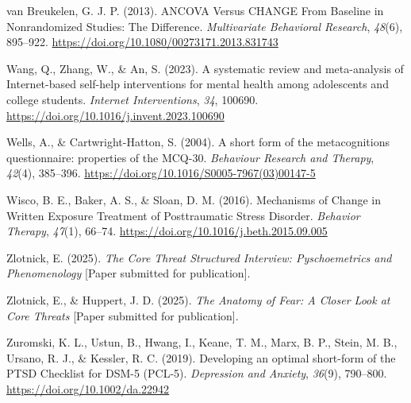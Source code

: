 \documentclass[
  man,floatsintext]{apa7}
\newlength{\cslhangindent}
\newlength{\cslentryspacingunit} %
\newenvironment{CSLReferences}[2] %
 {%
  \setlength{\parindent}{0pt}
  \ifodd #1
  \let\oldpar\par
  \def\par{\hangindent=\cslhangindent\oldpar}
  \fi
  \setlength{\parskip}{#2\cslentryspacingunit}
 }%
 {}
\begin{document}
\begin{CSLReferences}{1}{0}
\leavevmode{}%
van Breukelen, G. J. P. (2013). ANCOVA Versus CHANGE From Baseline in Nonrandomized Studies: The Difference. \emph{Multivariate Behavioral Research}, \emph{48}(6), 895--922. \url{https://doi.org/10.1080/00273171.2013.831743}

\leavevmode{}%
Wang, Q., Zhang, W., \& An, S. (2023). A systematic review and meta-analysis of Internet-based self-help interventions for mental health among adolescents and college students. \emph{Internet Interventions}, \emph{34}, 100690. \url{https://doi.org/10.1016/j.invent.2023.100690}

\leavevmode{}%
Wells, A., \& Cartwright-Hatton, S. (2004). A short form of the metacognitions questionnaire: properties of the MCQ-30. \emph{Behaviour Research and Therapy}, \emph{42}(4), 385--396. \url{https://doi.org/10.1016/S0005-7967(03)00147-5}

\leavevmode{}%
Wisco, B. E., Baker, A. S., \& Sloan, D. M. (2016). Mechanisms of Change in Written Exposure Treatment of Posttraumatic Stress Disorder. \emph{Behavior Therapy}, \emph{47}(1), 66--74. \url{https://doi.org/10.1016/j.beth.2015.09.005}

\leavevmode{}%
Zlotnick, E. (2025). \emph{The Core Threat Structured Interview: Pyschoemetrics and Phenomenology} {[}Paper submitted for publication{]}.

\leavevmode{}%
Zlotnick, E., \& Huppert, J. D. (2025). \emph{The Anatomy of Fear: A Closer Look at Core Threats} {[}Paper submitted for publication{]}.

\leavevmode{}%
Zuromski, K. L., Ustun, B., Hwang, I., Keane, T. M., Marx, B. P., Stein, M. B., Ursano, R. J., \& Kessler, R. C. (2019). Developing an optimal short-form of the PTSD Checklist for DSM-5 (PCL-5). \emph{Depression and Anxiety}, \emph{36}(9), 790--800. \url{https://doi.org/10.1002/da.22942}

\end{CSLReferences}
\end{document}
